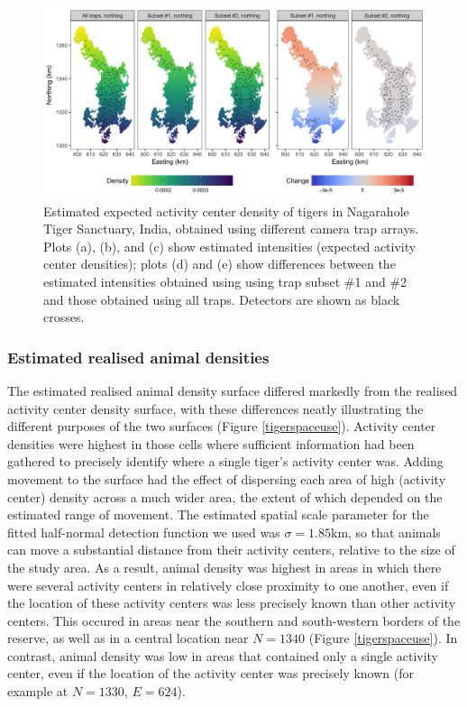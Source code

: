 \documentclass[10pt,a4paper]{article}
\begin{document}
\begin{figure}[htbp]
\centering
\includegraphics[width=1\textwidth]{tiger_surfaces_covs.png}
\caption{Estimated expected activity center density of tigers in Nagarahole Tiger Sanctuary, India, obtained using different camera trap arrays. Plots (a), (b), and (c) show estimated intensities (expected activity center densities); plots (d) and (e) show differences between the estimated intensities obtained using using trap subset \#1 and \#2 and those obtained using all traps. Detectors are shown as black crosses.}
\label{tigercov}
\end{figure}

\subsubsection{Estimated realised animal densities}

The estimated realised animal density surface differed markedly from the realised activity center density surface, with these differences neatly illustrating the different purposes of the two surfaces (Figure \ref{tigerspaceuse}). Activity center densities were highest in those cells where sufficient information had been gathered to precisely identify where a single tiger's activity center was. Adding movement to the surface had the effect of dispersing each area of high (activity center) density across a much wider area, the extent of which depended on the estimated range of movement. The estimated spatial scale parameter for the fitted half-normal detection function we used was $\sigma=1.85$km, so that animals can move a substantial distance from their activity centers, relative to the size of the study area. As a result, animal density was highest in areas in which there were several activity centers in relatively close proximity to one another, even if the location of these activity centers was less precisely known than other activity centers. This occured in areas near the southern and south-western borders of the reserve, as well as in a central location near $N=1340$ (Figure \ref{tigerspaceuse}). In contrast, animal density was low in areas that contained only a single activity center, even if the location of the activity center was precisely known (for example at $N=1330$, $E=624$).
\end{document}
